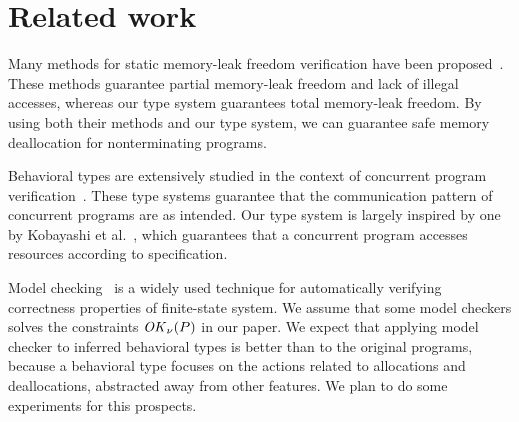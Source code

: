 
\section{Related work}\label{sec:relatedwork}
Many methods for static memory-leak freedom verification have been
proposed~\cite{DBLP:conf/aplas/SuenagaK09,DBLP:conf/pldi/HeineL03,DBLP:conf/sigsoft/XieA05,DBLP:journals/scp/SwamyHMGJ06,DBLP:conf/sas/OrlovichR06,DBLP:conf/issta/SuiYX12}. These
methods guarantee partial memory-leak freedom and lack of illegal
accesses, whereas our type system guarantees total memory-leak
freedom. By using both their methods and our type system, we can
guarantee safe memory deallocation for nonterminating programs.

Behavioral types are extensively studied in the context of concurrent
program
verification~\cite{DBLP:conf/esop/HondaVK98,DBLP:journals/tcs/IgarashiK04,DBLP:conf/esop/VieiraCS08,DBLP:journals/lmcs/KobayashiSW06}.
These type systems guarantee that the communication pattern of
concurrent programs are as intended.  Our type system is largely
inspired by one by Kobayashi et
al.~\cite{DBLP:journals/lmcs/KobayashiSW06}, which guarantees that a
concurrent program accesses resources according to specification.

Model checking~\cite{clarke1999model,ben2008principles,beyer2011cpachecker} is a widely used technique for automatically
verifying correctness properties of finite-state system. We assume
that some model checkers solves the constraints \(\mathit{OK}_\nu(P)\) in our
paper. We expect that applying model checker to inferred behavioral
types is better than to the original programs, because a behavioral
type focuses on the actions related to allocations and deallocations,
abstracted away from other features. We plan to do some experiments
for this prospects.


